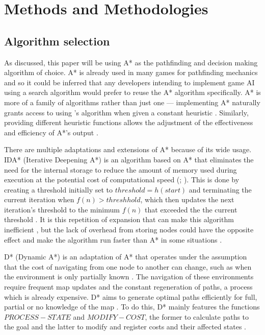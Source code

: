 \documentclass[11pt, a4paper]{report}
\begin{document}
\section{Methods and Methodologies}
\label{sec:methodsAndMethodologies}

\subsection{Algorithm selection}
\label{subsec:algorithmSelection}

As discussed, this paper will be using A* as the pathfinding and decision making algorithm of choice. A* is already used in many games for pathfinding mechanics \parencite[197]{millington2019ai} and so it could be inferred that any developers intending to implement game AI using a search algorithm would prefer to reuse the A* algorithm specifically. A* is more of a family of algorithms rather than just one \parencite[107]{hart1968formal} --- implementing A* naturally grants access to using \citeauthor{dijkstra1959note}'s algorithm \parencite*{dijkstra1959note} when given a constant heuristic \parencite[10]{lester2005pathfinding}. Similarly, providing different heuristic functions allows the adjustment of the effectiveness and efficiency of A*'s output \parencite[107]{hart1968formal}.

There are multiple adaptations and extensions of A* because of its wide usage. IDA* (Iterative Deepening A*) is an algorithm based on A* that eliminates the need for the internal storage \parencite[36]{korf1985depth} to reduce the amount of memory used during execution at the potential cost of computational speed (\cite[2]{botea2004near}; \cite[44]{yap2002grid}). This is done by creating a threshold initially set to $threshold = h(start)$ and terminating the current iteration when $f(n) > threshhold$, which then updates the next iteration's threshold to the minimum $f(n)$ that exceeded the the current threshold \parencite[103]{korf1985depth}. It is this repetition of expansion that can make this algorithm inefficient \parencite[46]{yap2002grid}, but the lack of overhead from storing nodes could have the opposite effect and make the algorithm run faster than A* in some situations \parencite[106]{korf1985depth}.

D* (Dynamic A*) is an adaptation of A* that operates under the assumption that the cost of navigating from one node to another can change, such as when the environment is only partially known \parencite[1-2]{stentz1997optimal}. The navigation of these environments require frequent map updates and the constant regeneration of paths, a process which is already expensive. D* aims to generate optimal paths efficiently for full, partial or no knowledge of the map \parencite[2]{stentz1997optimal}. To do this, D* mainly features the functions $PROCESS - STATE$ and $MODIFY - COST$, the former to calculate paths to the goal and the latter to modify and register costs and their affected states \parencite[3]{stentz1997optimal}.
\end{document}
